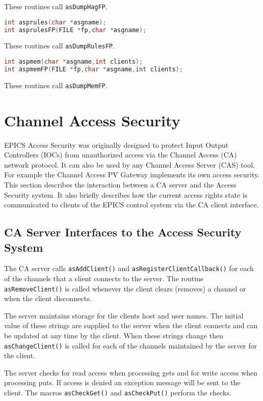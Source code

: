 These routines call \verb|asDumpHagFP|.

\begin{lstlisting}[language=C]
int asprules(char *asgname);
int asprulesFP(FILE *fp,char *asgname);
\end{lstlisting}

These routines call \verb|asDumpRulesFP|.

\begin{lstlisting}[language=C]
int aspmem(char *asgname,int clients);
int aspmemFP(FILE *fp,char *asgname,int clients);
\end{lstlisting}

These routines call \verb|asDumpMemFP|.

\section{Channel Access Security}

EPICS Access Security was originally designed to protect Input Output Controllers (IOCs) from unauthorized access via the Channel Access (CA) network protocol.
It can also be used by any Channel Access Server (CAS) tool.
For example the Channel Access PV Gateway implements its own access security.
This section describes the interaction between a CA server and the Access Security system.
It also briefly describes how the current access rights state is communicated to clients of the EPICS control system via the CA client interface.

\subsection{CA Server Interfaces to the Access Security System}

The CA server calls \verb|asAddClient()| and \verb|asRegisterClientCallback()| for each of the channels that a client connects to the server.
The routine \verb|asRemoveClient()| is called whenever the client clears (removes) a channel or when the client disconnects.

The server maintains storage for the clients host and user names.
The initial value of these strings are supplied to the server when the client connects and can be updated at any time by the client.
When these strings change then \verb|asChangeClient()| is called for each of the channels maintained by the server for the client.

The server checks for read access when processing gets and for write access when processing puts.
If access is denied an exception message will be sent to the client.
The macros \verb|asCheckGet()| and \verb|asCheckPut()| perform the checks.

